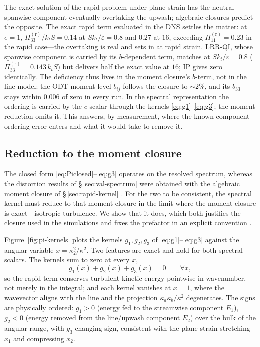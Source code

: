 \documentclass[lineno]{JFM-FLM_Au}
\providecommand{\DIFadd}[1]{{\protect\color{blue}\uwave{#1}}} %
\providecommand{\DIFaddbegin}{} %
\providecommand{\DIFaddend}{} %
\begin{document}
The exact solution of the rapid problem under plane strain has the neutral
spanwise component eventually overtaking the upwash; algebraic closures
predict the opposite. The exact rapid term evaluated in the DNS settles the
matter: at $e=1$, $\Pi^{(\mathrm r)}_{33}/k_tS = 0.14$ at
$Sk_t/\varepsilon=0.8$ and $0.27$ at $16$, exceeding
$\Pi^{(\mathrm r)}_{11}=0.23$ in the rapid case---the overtaking is real
and sets in at rapid strain. LRR-QI, whose spanwise component is carried by
its $b$-dependent term, matches at $Sk_t/\varepsilon=0.8$
($\Pi^{(\mathrm r)}_{33}=0.143\,k_tS$) but delivers half the exact value at
$16$; IP gives zero identically. The deficiency thus lives in the moment
closure's $b$-term, not in the line model: the ODT moment-level $b_{ij}$
follows the closure to $\sim2\%$, and its $b_{33}$ stays within $0.006$ of
zero in every run. In the spectral representation the ordering is carried
by the $c$-scalar through the kernels
\eqref{eq:g1}--\eqref{eq:g3}; the moment reduction omits it. This
answers, by measurement, where the known component-ordering error enters
and what it would take to remove it.

\subsection{Reduction to the moment closure}\label{sec:lrr-reduction}

The closed form \eqref{eq:Piclosed}--\eqref{eq:g3} operates on the resolved
spectrum, whereas the distortion results of \S\,\ref{sec:val-spectrum} were
obtained with the algebraic moment closure of \S\,\ref{sec:rapid-kernel}
\citep{LaunderReeceRodi1975}. For the two to be consistent, the spectral
kernel must reduce to that moment closure in the limit where the moment
closure is exact---isotropic turbulence. We show that it does, which both
justifies the closure used in the simulations and fixes the prefactor in an explicit convention \DIFaddbegin \DIFadd{(the coefficient of \eqref{eq:crow-spectral} and the remark following it)}\DIFaddend .

Figure~\ref{fig:pi-kernels} plots the kernels $g_1,g_2,g_3$ of
\eqref{eq:g1}--\eqref{eq:g3} against the angular variable
$x=\kappa_2^2/\kappa^2$. Two features are exact and hold for both spectral
scalars. The kernels sum to zero at every $x$,
\begin{equation}
  g_1(x)+g_2(x)+g_3(x)=0 \qquad \forall x,
  \label{eq:gtrace}
\end{equation}
so the rapid term conserves turbulent kinetic energy pointwise in wavenumber,
not merely in the integral; and each kernel vanishes at $x=1$, where the
wavevector aligns with the line and the projection $\kappa_a\kappa_b/\kappa^2$
degenerates. The signs are physically ordered: $g_1>0$ (energy fed to the
streamwise component $E_1$), $g_2<0$ (energy removed from the line/upwash
component $E_2$) over the bulk of the angular range, with $g_3$ changing sign,
consistent with the plane strain stretching $x_1$ and compressing $x_2$.
\end{document}
